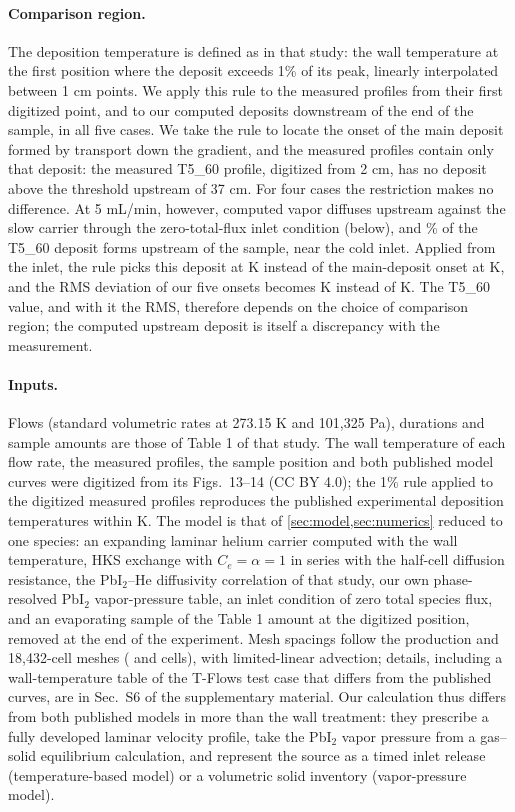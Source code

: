 \paragraph{Comparison region.} The deposition temperature is defined as
in that study: the wall temperature at the first position where the
deposit exceeds 1\% of its peak, linearly interpolated between 1 cm
points. We apply this rule to the measured profiles from their first
digitized point, and to our computed deposits downstream of the end of
the sample, in all five cases. We take the rule to locate the onset of
the main deposit formed by transport down the gradient, and the
measured profiles contain only that deposit: the measured T5\_60 profile, digitized from 2 cm, has no
deposit above the threshold upstream of 37 cm. For four cases the
restriction makes no difference. At 5 mL/min, however, computed vapor
diffuses upstream against the slow carrier through the zero-total-flux
inlet condition (below), and \LobFiveUpstream\% of the T5\_60 deposit
forms upstream of the sample, near the cold inlet. Applied from the
inlet, the rule picks this deposit at \LobFiveInlet{} K instead of the
main-deposit onset at \LobFiveMain{} K, and the RMS deviation of our
five onsets becomes \LobRMSInlet{} K instead of \LobRMS{} K. The T5\_60
value, and with it the RMS, therefore depends on the choice of
comparison region; the computed upstream deposit is itself a
discrepancy with the measurement.

\paragraph{Inputs.} Flows (standard volumetric rates at 273.15 K and
101,325 Pa), durations and sample amounts are those of Table 1 of that
study. The wall temperature of each flow rate, the measured profiles,
the sample position and both published model curves were digitized from
its Figs.~13--14 (CC BY 4.0); the 1\% rule applied to the digitized
measured profiles reproduces the published experimental deposition
temperatures within \LobDigitised{} K. The model is that of
\cref{sec:model,sec:numerics} reduced to one species: an expanding
laminar helium carrier computed with the wall temperature, HKS exchange
with $C_e=\alpha=1$ in series with the half-cell diffusion resistance,
the PbI$_2$--He diffusivity correlation of that study, our own
phase-resolved PbI$_2$ vapor-pressure table, an inlet condition of zero
total species flux, and an evaporating sample of the Table 1 amount at
the digitized position, removed at the end of the experiment. Mesh
spacings follow the production and 18,432-cell meshes
(\LobCellsProd{} and \LobCellsCoarse{} cells), with limited-linear
advection; details, including a wall-temperature table of the T-Flows
test case that differs from the published curves, are in Sec.~S6 of the
supplementary material. Our calculation thus differs from both
published models in more than the wall treatment: they prescribe a
fully developed laminar velocity profile, take the PbI$_2$ vapor
pressure from a gas--solid equilibrium calculation, and represent the
source as a timed inlet release (temperature-based model) or a
volumetric solid inventory (vapor-pressure model).

